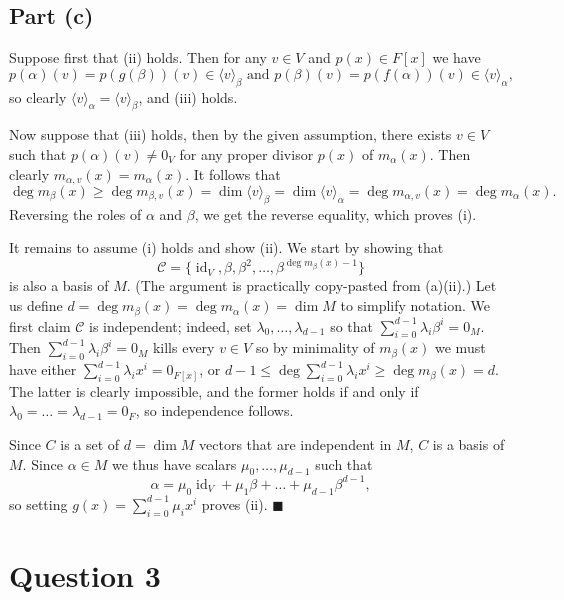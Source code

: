 \documentclass[12pt]{article}
\DeclareMathOperator{\id}{id}
\begin{document}
\subsection*{Part (c)}
Suppose first that (ii) holds. Then for any $v\in V$ and $p(x)\in F[x]$ we have
\[
    p(\alpha)(v)=p(g(\beta))(v)\in\langle v\rangle_\beta \text{ and }
    p(\beta)(v)=p(f(\alpha))(v)\in\langle v\rangle_\alpha,
\]
so clearly $\langle v \rangle_\alpha=\langle v \rangle_\beta$, and (iii) holds.

Now suppose that (iii) holds, then by the given assumption, there exists
$v\in V$ such that $p(\alpha)(v)\neq 0_V$ for any proper divisor $p(x)$ of 
$m_\alpha(x)$. Then clearly $m_{\alpha, v}(x)=m_\alpha(x)$. It follows that
\[
    \deg m_\beta(x)
    \ge\deg m_{\beta, v}(x)
    =\dim\langle v \rangle_\beta
    =\dim\langle v \rangle_\alpha
    =\deg m_{\alpha, v}(x)
    =\deg m_\alpha(x).
\]
Reversing the roles of $\alpha$ and $\beta$, we get the reverse equality, which
proves (i).

It remains to assume (i) holds and show (ii). We start by showing that
\[
    \mathcal{C}=\{\id_V,\beta,\beta^2,\ldots,\beta^{\deg m_\beta(x)-1}\}
\]
is also a basis of $M$. (The argument is practically copy-pasted from (a)(ii).)
Let us define $d=\deg m_\beta(x)=\deg m_\alpha(x)=\dim M$ to simplify notation.
We first claim $\mathcal{C}$ is independent; indeed, set
$\lambda_0,\ldots,\lambda_{d-1}$ so that
$\sum_{i=0}^{d-1}\lambda_i\beta^i=0_{M}$. Then
$\sum_{i=0}^{d-1}\lambda_i\beta^i=0_{M}$
kills every $v\in V$ so by minimality
of $m_\beta(x)$ we must have either
$\sum_{i=0}^{d-1}\lambda_i x^i=0_{F[x]}$, or $d-1\leq\deg
\sum_{i=0}^{d-1}\lambda_i x^i \ge \deg m_\beta(x)=d$.
The latter is clearly
impossible, and the former holds if and only if
$\lambda_0=\ldots=\lambda_{d-1}=0_F$, so independence follows.

Since $C$ is a set of $d=\dim M$ vectors that are independent in $M$, $C$ is
a basis of $M$. Since $\alpha\in M$ we thus have scalars
$\mu_0,\ldots,\mu_{d-1}$ such that
\[
    \alpha=\mu_0\id_V+\mu_1\beta+\ldots+\mu_{d-1}\beta^{d-1},
\]
so setting $g(x)=\sum_{i=0}^{d-1}\mu_i x^i$ proves (ii).
\hfill$\blacksquare$

\newpage
\section*{Question 3}
\end{document}
